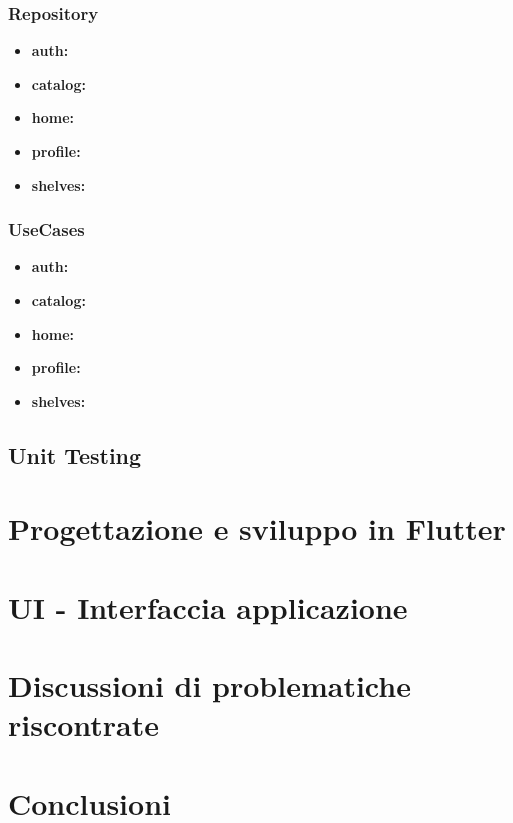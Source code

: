 \documentclass{article}
\begin{document}
\subsubsection{Repository}
\begin{itemize}
  \item \textbf{auth:}
  \item \textbf{catalog:}
  \item \textbf{home:}
  \item \textbf{profile:}
  \item \textbf{shelves:}
\end{itemize}

\subsubsection{UseCases}
\begin{itemize}
  \item \textbf{auth:}
  \item \textbf{catalog:}
  \item \textbf{home:}
  \item \textbf{profile:}
  \item \textbf{shelves:}
\end{itemize}

\subsection{Unit Testing}

\section{Progettazione e sviluppo in Flutter}

\section{UI - Interfaccia applicazione}

\section{Discussioni di problematiche riscontrate}

\section{Conclusioni}
\end{document}
